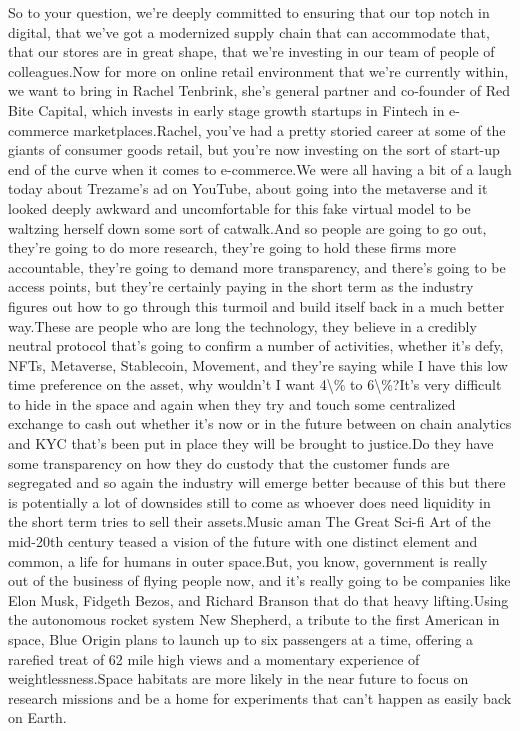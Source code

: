 \documentclass{article}%
\begin{document}
So to your question, we're deeply committed to ensuring that our top notch in digital, that we've got a modernized supply chain that can accommodate that, that our stores are in great shape, that we're investing in our team of people of colleagues.Now for more on online retail environment that we're currently within, we want to bring in Rachel Tenbrink, she's general partner and co{-}founder of Red Bite Capital, which invests in early stage growth startups in Fintech in e{-}commerce marketplaces.Rachel, you've had a pretty storied career at some of the giants of consumer goods retail, but you're now investing on the sort of start{-}up end of the curve when it comes to e{-}commerce.We were all having a bit of a laugh today about Trezame's ad on YouTube, about going into the metaverse and it looked deeply awkward and uncomfortable for this fake virtual model to be waltzing herself down some sort of catwalk.And so people are going to go out, they're going to do more research, they're going to hold these firms more accountable, they're going to demand more transparency, and there's going to be access points, but they're certainly paying in the short term as the industry figures out how to go through this turmoil and build itself back in a much better way.These are people who are long the technology, they believe in a credibly neutral protocol that's going to confirm a number of activities, whether it's defy, NFTs, Metaverse, Stablecoin, Movement, and they're saying while I have this low time preference on the asset, why wouldn't I want 4\textbackslash{}\% to 6\textbackslash{}\%?It's very difficult to hide in the space and again when they try and touch some centralized exchange to cash out whether it's now or in the future between on chain analytics and KYC that's been put in place they will be brought to justice.Do they have some transparency on how they do custody that the customer funds are segregated and so again the industry will emerge better because of this but there is potentially a lot of downsides still to come as whoever does need liquidity in the short term tries to sell their assets.Music  aman The Great Sci{-}fi Art of the mid{-}20th century teased a vision of the future with one distinct element and common, a life for humans in outer space.But, you know, government is really out of the business of flying people now, and it's really going to be companies like Elon Musk, Fidgeth Bezos, and Richard Branson that do that heavy lifting.Using the autonomous rocket system New Shepherd, a tribute to the first American in space, Blue Origin plans to launch up to six passengers at a time, offering a rarefied treat of 62 mile high views and a momentary experience of weightlessness.Space habitats are more likely in the near future to focus on research missions and be a home for experiments that can't happen as easily back on Earth.%
\end{document}
